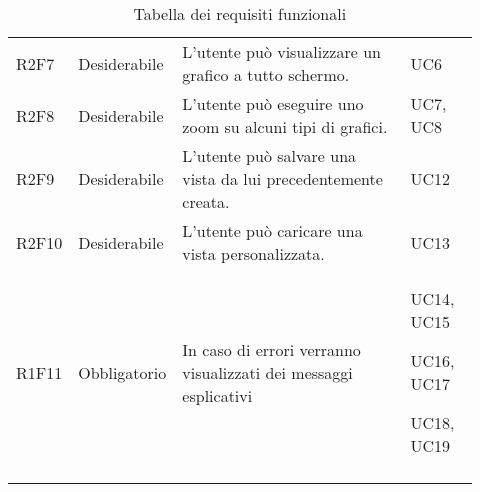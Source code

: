{\begin{longtable}{p{0.12\linewidth}p{0.15\linewidth}p{0.50\linewidth}p{0.15\linewidth}}
    \rowcolor[RGB]{216, 235, 171}
    R2F7 & Desiderabile & L'utente può visualizzare un grafico a tutto schermo. & UC6\\
    
    \rowcolor[RGB]{233, 245, 206}
    R2F8 & Desiderabile & L'utente può eseguire uno zoom su alcuni tipi di grafici. & UC7, UC8\\
    
    \rowcolor[RGB]{216, 235, 171}
    R2F9 & Desiderabile & L'utente può salvare una vista da lui precedentemente creata. & UC12\\
    
    \rowcolor[RGB]{233, 245, 206}
    R2F10 & Desiderabile & L'utente può caricare una vista personalizzata.  & UC13\\

    \rowcolor[RGB]{216, 235, 171}
    R1F11 & Obbligatorio & In caso di errori verranno visualizzati dei messaggi esplicativi & UC14, UC15 \par UC16, UC17 \par UC18, UC19\\

    \caption{Tabella dei requisiti funzionali}

\end{longtable}	
}


\newpage
